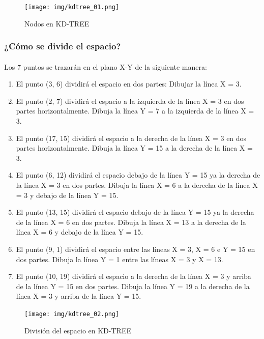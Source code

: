 \documentclass{article}
\begin{document}
\begin{figure}[h!]
	\centering
	\texttt{[image: img/kdtree\_01.png]}
	\caption{Nodos en KD-TREE}
	\label{fig:kdtree_01}
\end{figure}

\subsubsection{¿Cómo se divide el espacio?}
\paragraph{}
Los 7 puntos se trazarán en el plano X-Y de la siguiente manera:

\begin{enumerate}
	\item El punto (3, 6) dividirá el espacio en dos partes: Dibujar la línea X = 3.
	\item El punto (2, 7) dividirá el espacio a la izquierda de la línea X = 3 en dos partes horizontalmente. Dibuja la línea Y = 7 a la izquierda de la línea X = 3.
	\item El punto (17, 15) dividirá el espacio a la derecha de la línea X = 3 en dos partes horizontalmente. Dibuja la línea Y = 15 a la derecha de la línea X = 3.
	\item El punto (6, 12) dividirá el espacio debajo de la línea Y = 15 ya la derecha de la línea X = 3 en dos partes. Dibuja la línea X = 6 a la derecha de la línea X = 3 y debajo de la línea Y = 15.
	\item El punto (13, 15) dividirá el espacio debajo de la línea Y = 15 ya la derecha de la línea X = 6 en dos partes. Dibuja la línea X = 13 a la derecha de la línea X = 6 y debajo de la línea Y = 15.
	\item El punto (9, 1) dividirá el espacio entre las líneas X = 3, X = 6 e Y = 15 en dos partes. Dibuja la línea Y = 1 entre las líneas X = 3 y X = 13.
	\item El punto (10, 19) dividirá el espacio a la derecha de la línea X = 3 y arriba de la línea Y = 15 en dos partes. Dibuja la línea Y = 19 a la derecha de la línea X = 3 y arriba de la línea Y = 15.
\end{enumerate}

\begin{figure}[h!]
	\centering
	\texttt{[image: img/kdtree\_02.png]}
	\caption{División del espacio en KD-TREE}
	\label{fig:kdtree_02}
\end{figure}
\end{document}
